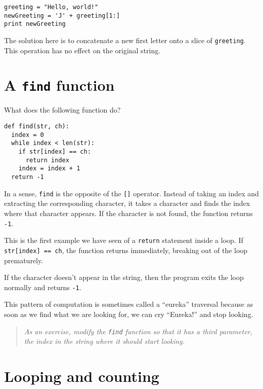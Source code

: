 \beforeverb
\begin{verbatim}
greeting = "Hello, world!"
newGreeting = 'J' + greeting[1:]
print newGreeting
\end{verbatim}
\afterverb
%
The solution here is to concatenate a new first letter onto
a slice of {\tt greeting}.  This operation has no effect on
the original string.


\pagebreak

\section{A {\tt find} function}
\label{find}

What does the following function do?

\beforeverb
\begin{verbatim}
def find(str, ch):
  index = 0
  while index < len(str):
    if str[index] == ch:
      return index
    index = index + 1
  return -1
\end{verbatim}
\afterverb
%
In a sense, {\tt find} is the opposite of the {\tt []} operator.
Instead of taking an index and extracting the corresponding character,
it takes a character and finds the index where that character
appears.  If the character is not found, the function returns {\tt
-1}.

This is the first example we have seen of a {\tt return} statement
inside a loop.
If {\tt str[index] == ch}, the function returns
immediately, breaking out of the loop prematurely.

If the character doesn't appear in the string, then the program
exits the loop normally and 
returns {\tt -1}.

This pattern of computation is sometimes called a ``eureka'' traversal
because as soon as we find what we are looking for, we can cry
``Eureka!'' and stop looking.

\begin{quote}
{\em As an exercise, modify the {\tt find} function so that it has a
third parameter, the index in the string where it should start
looking.}
\end{quote}


\section{Looping and counting}
\label{counter}

